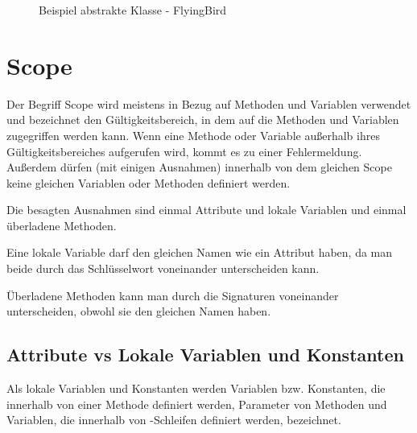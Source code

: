 \documentclass{tuda-pub}
\begin{document}
  \begin{figure}[h]
    \centering
    
    \caption{Beispiel abstrakte Klasse -  FlyingBird}
  \end{figure}

  \clearpage


  \section{Scope}
  \label{sec:Scope}
  Der Begriff Scope wird meistens in Bezug auf Methoden und Variablen verwendet und bezeichnet
  den Gültigkeitsbereich, in dem auf die Methoden und Variablen zugegriffen werden kann. Wenn
  eine Methode oder Variable außerhalb ihres Gültigkeitsbereiches aufgerufen wird, kommt es zu
  einer Fehlermeldung. Außerdem dürfen (mit einigen Ausnahmen) innerhalb von dem gleichen Scope
  keine gleichen Variablen oder Methoden definiert werden.

  \begin{note}[title=Information:]
    Die besagten Ausnahmen sind einmal Attribute und lokale Variablen und einmal überladene
    Methoden.

    \br

    Eine lokale Variable darf den gleichen Namen wie ein Attribut haben, da man beide durch das
    Schlüsselwort  voneinander unterscheiden kann.

    \br

    Überladene Methoden kann man durch die Signaturen voneinander unterscheiden, obwohl sie den
    gleichen Namen haben.
  \end{note}

  \subsection{Attribute vs Lokale Variablen und Konstanten}
  \label{sec:Attribute_vs_lokale_Variablen_und_Konstanten}

  Als lokale Variablen und Konstanten werden Variablen bzw. Konstanten, die innerhalb von einer
  Methode definiert werden, Parameter von Methoden und Variablen, die innerhalb von
  -Schleifen definiert werden, bezeichnet.

  \br
\end{document}
